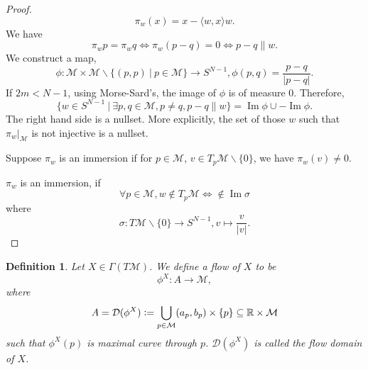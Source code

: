 \documentclass[10pt]{article}
\newtheorem{definition}{Definition}[section]
\DeclareMathOperator{\Image}{Im}
\newcommand{\defeq}{\vcentcolon=}
\newcommand{\R}[0]{\mathbb{R}}
\newcommand{\M}[0]{\mathcal{M}}
\newcommand{\sep}[0]{\:|\:}
\begin{document}
\begin{proof}
  \begin{equation*}
    \pi_w(x) = x-\langle w,x\rangle w.
  \end{equation*}
  We have 
  \begin{equation*}
    \pi_wp = \pi_wq \Leftrightarrow\pi_w(p-q) = 0 \Leftrightarrow p-q\parallel w.
  \end{equation*}
  We construct a map,
  \begin{equation*}
    \phi:\M\times\M\backslash\{(p,p)\sep p\in\M\}\to S^{N-1}, \phi(p,q) = {\frac {p-q} {\vert p-q\vert}}.
  \end{equation*}
  If $2m<N-1$, using Morse-Sard's, the image of $\phi$ is of measure $0$. Therefore,
  \begin{equation*}
    \{w\in S^{N-1}\sep\exists p,q\in\M, p\not=q,p-q\parallel w\} = \Image\phi\cup -\Image\phi.
  \end{equation*}
  The right hand side is a nullset. More explicitly, the set of those $w$ such that $\pi_w|_\M$ is not injective is a nullset.
  \par Suppose $\pi_w$ is an immersion if for $p\in\M$, $v\in T_p\M\backslash\{0\}$, we have $\pi_w(v)\not=0$.
  \par $\pi_w$ is an immersion, if
  \begin{equation*}
    \forall p\in\M, w\not\in T_p\M \Leftrightarrow\not\in\Image\sigma
  \end{equation*}
  where 
  \begin{equation*}
    \sigma:T\M\backslash\{0\}\to S^{N-1}, v\mapsto {\frac v {\vert v\vert}}.
    \end{equation*} 
    
\end{proof}

\begin{definition}
  Let $X\in\Gamma(T\M)$. We define a flow of $X$ to be 
  \begin{equation*}
    \phi^X:A\to \M,
  \end{equation*}
  where 
  \begin{equation*}
    A = \mathcal{D}(\phi^X) \defeq \bigcup_{p\in\M} (a_p,b_p)\times \{p\}\subseteq \R\times \M
  \end{equation*}
  such that $\phi^X(p)$ is maximal curve through $p$. $\mathcal{D}(\phi^X)$ is called the flow domain of $X$.
\end{definition}
\end{document}
